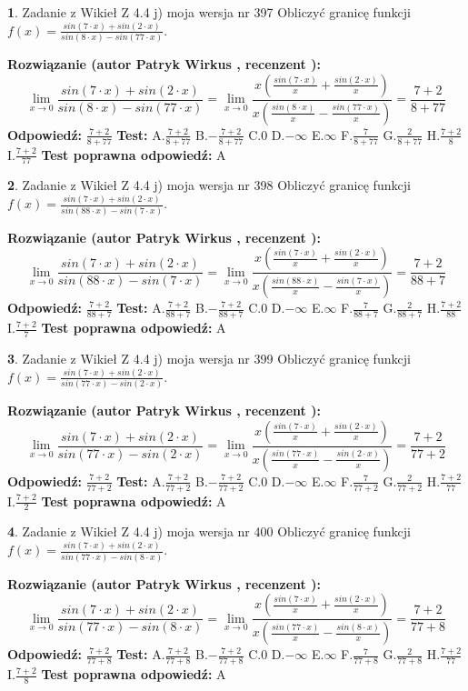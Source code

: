 \documentclass[12pt, a4paper]{article}
\theoremstyle{definition} %
\newtheorem{zad}{}
\newcommand{\zadStart}[1]{\begin{zad}#1\newline}
\newcommand{\zadStop}{\end{zad}}
\newcommand{\rozwStart}[2]{\noindent \textbf{Rozwiązanie (autor #1 , recenzent #2): }\newline}
\newcommand{\rozwStop}{\newline}
\newcommand{\odpStart}{\noindent \textbf{Odpowiedź:}\newline}
\newcommand{\odpStop}{\newline}
\newcommand{\testStart}{\noindent \textbf{Test:}\newline}
\newcommand{\testStop}{\newline}
\newcommand{\kluczStart}{\noindent \textbf{Test poprawna odpowiedź:}\newline}
\newcommand{\kluczStop}{\newline}
\begin{document}
\zadStart{Zadanie z Wikieł Z 4.4 j) moja wersja nr 397}
Obliczyć granicę funkcji $f(x)=\frac{sin(7\cdot x) +sin(2\cdot x)}{sin(8\cdot x) -sin(77\cdot x)}$.
\zadStop
\rozwStart{Patryk Wirkus}{}
$$\lim\limits_{x\to 0}\frac{sin(7\cdot x) +sin(2\cdot x)}{sin(8\cdot x) -sin(77\cdot x)}=\lim\limits_{x\to 0}\frac{x(\frac{sin(7\cdot x)}{x}+\frac{sin(2\cdot x)}{x})}{x(\frac{sin(8\cdot x)}{x}-\frac{sin(77\cdot x)}{x})}=\frac{7+2}{8+77}$$
\rozwStop
\odpStart
$\frac{7+2}{8+77}$
\odpStop
\testStart
A.$\frac{7+2}{8+77}$
B.$-\frac{7+2}{8+77}$
C.$0$
D.$-\infty$
E.$\infty$
F.$\frac{7}{8+77}$
G.$\frac{2}{8+77}$
H.$\frac{7+2}{8}$
I.$\frac{7+2}{77}$
\testStop
\kluczStart
A
\kluczStop



\zadStart{Zadanie z Wikieł Z 4.4 j) moja wersja nr 398}
Obliczyć granicę funkcji $f(x)=\frac{sin(7\cdot x) +sin(2\cdot x)}{sin(88\cdot x) -sin(7\cdot x)}$.
\zadStop
\rozwStart{Patryk Wirkus}{}
$$\lim\limits_{x\to 0}\frac{sin(7\cdot x) +sin(2\cdot x)}{sin(88\cdot x) -sin(7\cdot x)}=\lim\limits_{x\to 0}\frac{x(\frac{sin(7\cdot x)}{x}+\frac{sin(2\cdot x)}{x})}{x(\frac{sin(88\cdot x)}{x}-\frac{sin(7\cdot x)}{x})}=\frac{7+2}{88+7}$$
\rozwStop
\odpStart
$\frac{7+2}{88+7}$
\odpStop
\testStart
A.$\frac{7+2}{88+7}$
B.$-\frac{7+2}{88+7}$
C.$0$
D.$-\infty$
E.$\infty$
F.$\frac{7}{88+7}$
G.$\frac{2}{88+7}$
H.$\frac{7+2}{88}$
I.$\frac{7+2}{7}$
\testStop
\kluczStart
A
\kluczStop



\zadStart{Zadanie z Wikieł Z 4.4 j) moja wersja nr 399}
Obliczyć granicę funkcji $f(x)=\frac{sin(7\cdot x) +sin(2\cdot x)}{sin(77\cdot x) -sin(2\cdot x)}$.
\zadStop
\rozwStart{Patryk Wirkus}{}
$$\lim\limits_{x\to 0}\frac{sin(7\cdot x) +sin(2\cdot x)}{sin(77\cdot x) -sin(2\cdot x)}=\lim\limits_{x\to 0}\frac{x(\frac{sin(7\cdot x)}{x}+\frac{sin(2\cdot x)}{x})}{x(\frac{sin(77\cdot x)}{x}-\frac{sin(2\cdot x)}{x})}=\frac{7+2}{77+2}$$
\rozwStop
\odpStart
$\frac{7+2}{77+2}$
\odpStop
\testStart
A.$\frac{7+2}{77+2}$
B.$-\frac{7+2}{77+2}$
C.$0$
D.$-\infty$
E.$\infty$
F.$\frac{7}{77+2}$
G.$\frac{2}{77+2}$
H.$\frac{7+2}{77}$
I.$\frac{7+2}{2}$
\testStop
\kluczStart
A
\kluczStop



\zadStart{Zadanie z Wikieł Z 4.4 j) moja wersja nr 400}
Obliczyć granicę funkcji $f(x)=\frac{sin(7\cdot x) +sin(2\cdot x)}{sin(77\cdot x) -sin(8\cdot x)}$.
\zadStop
\rozwStart{Patryk Wirkus}{}
$$\lim\limits_{x\to 0}\frac{sin(7\cdot x) +sin(2\cdot x)}{sin(77\cdot x) -sin(8\cdot x)}=\lim\limits_{x\to 0}\frac{x(\frac{sin(7\cdot x)}{x}+\frac{sin(2\cdot x)}{x})}{x(\frac{sin(77\cdot x)}{x}-\frac{sin(8\cdot x)}{x})}=\frac{7+2}{77+8}$$
\rozwStop
\odpStart
$\frac{7+2}{77+8}$
\odpStop
\testStart
A.$\frac{7+2}{77+8}$
B.$-\frac{7+2}{77+8}$
C.$0$
D.$-\infty$
E.$\infty$
F.$\frac{7}{77+8}$
G.$\frac{2}{77+8}$
H.$\frac{7+2}{77}$
I.$\frac{7+2}{8}$
\testStop
\kluczStart
A
\kluczStop
\end{document}
